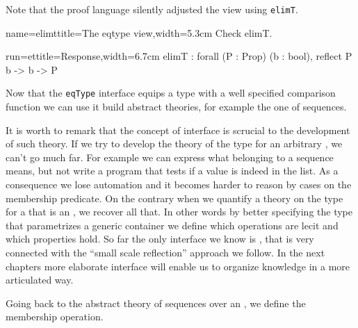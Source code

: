 


Note that the proof language silently adjusted the view
using \lstinline/elimT/.

\begin{coq}{name=elimt}{title=The eqtype view,width=5.3cm}
Check elimT.

\end{coq}
\begin{coqout}{run=et}{title=Response,width=6.7cm}
elimT : forall (P : Prop) (b : bool),
          reflect P b -> b -> P
\end{coqout}

\mcbREQUIRE{}
\mcbPROVIDE{\\in}
\label{sec:eqtypetheory}

Now that the \lstinline/eqType/ interface equips a type with a well
specified comparison function we can use it build abstract theories,
for example the one of sequences.

It is worth to remark that the concept of interface is scrucial to
the development of such theory.  If we try to develop the theory
of the type  for an arbitrary , we can't go much far.
For example we can express what belonging to a sequence means, but
not write a program that tests if a value is indeed in the list.  As a
consequence we lose automation and it becomes harder to reason by
cases on the membership predicate.
On the contrary when we quantify a theory on the type   for a
 that is an , we recover all that.  In other words
by better specifying the type that parametrizes a generic container
we define which operations are lecit and which properties hold.
So far the only interface we know is , that is very
connected with the ``small scale reflection'' approach we follow.
In the next chapters more elaborate interface will enable us to
organize knowledge in a more articulated way.

Going back to the abstract theory of sequences over an ,
we define the membership operation.

